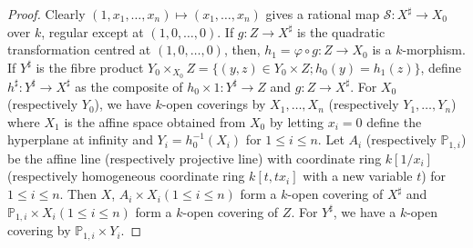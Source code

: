 \begin{proof}
Clearly $(1,x_{1},\ldots,x_{n})\mapsto (x_{1},\ldots,x_{n})$ gives a
rational map $\mathscr{S}:X^{\sharp}\to X_{0}$ over $k$, regular except at
$(1,0,\ldots,0)$. If $g:Z\to X^{\sharp}$ is the quadratic
transformation centred at $(1,0,\ldots,0)$, then, $h_{1}=\varphi\circ
g:Z\to X_{0}$ is a $k$-morphism. If $Y^{\sharp}$ is the fibre product
$Y_{0}\times_{X_{0}}Z=\{(y,z)\in Y_{0}\times Z;h_{0}(y)=h_{1}(z)\}$,
define $h^{\sharp}:Y^{\sharp}\to X^{\sharp}$ as the composite of
$h_{0}\times 1:Y^{\sharp}\to Z$ and $g:Z\to X^{\sharp}$. For $X_{0}$
(respectively $Y_{0}$), we have $k$-open coverings by
$X_{1},\ldots,X_{n}$ (respectively $Y_{1},\ldots,Y_{n}$) where $X_{1}$
is the affine space obtained from $X_{0}$ by letting $x_{i}=0$ define
the hyperplane at infinity and $Y_{i}=h^{-1}_{0}(X_{i})$ for $1\leq
i\leq n$. Let $A_{i}$ (respectively $\mathbb{P}_{1,i}$) be the affine
line (respectively projective line) with coordinate ring $k[1/x_{i}]$
(respectively homogeneous coordinate ring $k[t,tx_{i}]$ with a new
variable $t$) for $1\leq i\leq n$. Then $X$, $A_{i}\times X_{i}(1\leq
i\leq n)$ form a $k$-open covering of $X^{\sharp}$ and
$\mathbb{P}_{1,i}\times X_{i}(1\leq i\leq n)$ form a $k$-open covering
of $Z$. For $Y^{\sharp}$, we have a $k$-open covering by
$\mathbb{P}_{1,i}\times Y_{i}$.
\end{proof}

